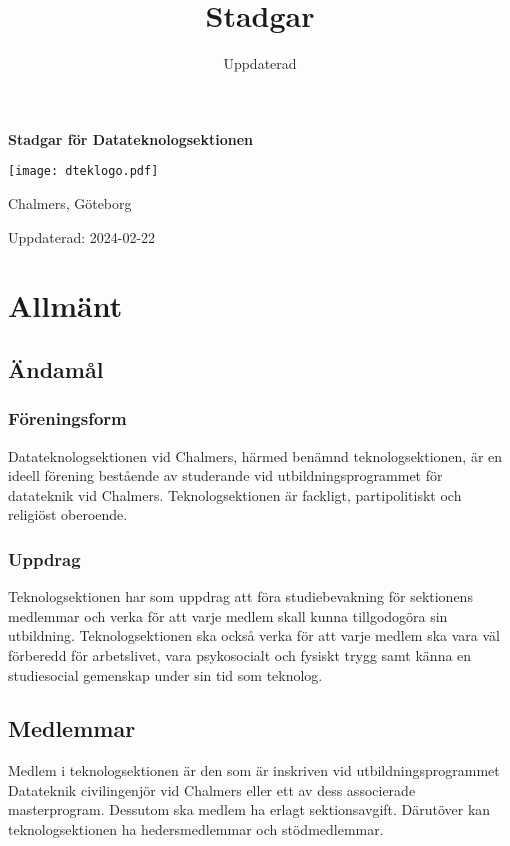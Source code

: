 \documentclass[a4paper]{dtek}
\title{Stadgar}
\date{Uppdaterad \updated}
\newcommand{\updated}{2024-02-22} %
\begin{document}
\makeheadfoot

\vspace*{\fill}
\begin{center}
{\Huge \textbf{Stadgar för Datateknologsektionen}}
\par\bigskip
\texttt{[image: dteklogo.pdf]}
\par\bigskip
{\LARGE Chalmers, Göteborg}
\end{center}
\vspace*{\fill}
\begin{center}
{\LARGE Uppdaterad: \updated}
\end{center}
\vspace*{\fill}

\renewcommand{\thesection}{\S\arabic{section}}

\newpage
\setcounter{tocdepth}{1}
\tableofcontents
\newpage

\section{Allmänt}
\subsection{Ändamål}
\subsubsection{Föreningsform}
Datateknologsektionen vid Chalmers, härmed benämnd teknologsektionen, är en ideell förening bestående av studerande vid utbildningsprogrammet för datateknik vid Chalmers.
Teknologsektionen är fackligt, partipolitiskt och religiöst oberoende.
\subsubsection{Uppdrag}
Teknologsektionen har som uppdrag att föra studiebevakning för sektionens medlemmar och verka för att varje medlem skall kunna tillgodogöra sin utbildning.
Teknologsektionen ska också verka för att varje medlem ska vara väl förberedd för arbetslivet, vara psykosocialt och fysiskt trygg samt känna en studiesocial gemenskap under sin tid som teknolog.
\subsection{Medlemmar}
Medlem i teknologsektionen är den som är inskriven vid utbildningsprogrammet Datateknik civilingenjör vid Chalmers eller ett av dess associerade masterprogram. Dessutom ska medlem ha erlagt sektionsavgift. Därutöver kan teknologsektionen ha hedersmedlemmar och stödmedlemmar.
\end{document}
